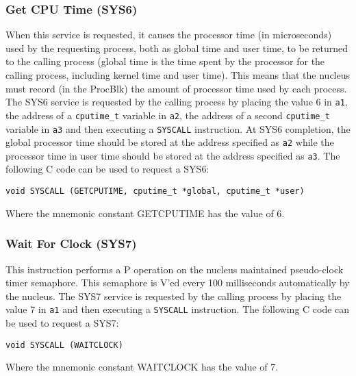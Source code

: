 \subsubsection{Get CPU Time (SYS6)}
When this service is requested, it causes the processor time (in microseconds) used
by the requesting process, both as global time and user time, to be
returned to the calling process (global time is the time spent by
the processor for the calling process, including kernel time and user
time).
This means that the nucleus must record (in the ProcBlk) the amount of processor time used by
each process.
The SYS6 service is requested by the calling process by placing the value 6 in
\verb+a1+, the address of a \verb+cputime_t+ variable in \verb+a2+, the
address of a second \verb+cputime_t+ variable in \verb+a3+ and then
executing a \verb+SYSCALL+ instruction.
At SYS6 completion, the global processor time should be
stored at the address specified as \verb+a2+ while the processor time in
user time should be stored at the address specified as \verb+a3+.
The following C code can be used to request a SYS6:
\begin{verbatim}
void SYSCALL (GETCPUTIME, cputime_t *global, cputime_t *user)
\end{verbatim}
	Where the mnemonic constant GETCPUTIME has the value of 6.
\subsubsection{Wait For Clock (SYS7)}
This instruction performs a P operation on the nucleus maintained pseudo-clock
timer semaphore. This semaphore is V'ed every 100 milliseconds automatically
by the nucleus.
The SYS7 service is requested by the calling process by placing the value 7 in
\verb+a1+ and then executing a \verb+SYSCALL+ instruction.
The following C code can be used to request a SYS7:
\begin{verbatim}
void SYSCALL (WAITCLOCK)
\end{verbatim}
	Where the mnemonic constant WAITCLOCK has the value of 7.
